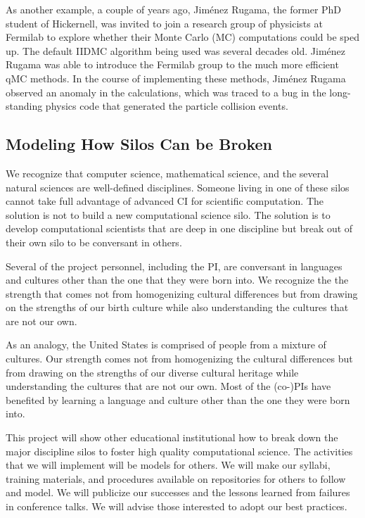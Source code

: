 \documentclass[11pt]{NSFamsart}
\begin{document}
As another example, a couple of years ago, Jim\'enez Rugama, the former PhD student of Hickernell, was invited to join a research group of physicists at Fermilab to explore whether their Monte Carlo (MC) computations could be sped up.  The default IIDMC algorithm being used was several decades old.  Jim\'enez Rugama was able to introduce the Fermilab group to the much more efficient qMC methods.  In the course of implementing these methods, Jim\'enez Rugama observed an anomaly in the calculations, which was traced to a bug in the long-standing physics code that generated the particle collision events.

\subsection{Modeling How Silos Can be Broken}
We recognize that computer science, mathematical science, and the several natural sciences are well-defined disciplines.  Someone living in one of these silos cannot take full advantage of advanced CI for scientific computation.  The solution is not to build a new computational science silo.  The solution is to develop computational scientists that are deep in one discipline but break out of their own silo to be conversant in others.

Several of the project personnel, including the PI, are conversant in languages and cultures other than the one that they were born into.  We recognize the the strength that comes not from homogenizing cultural differences but from drawing on the strengths of our birth culture while also understanding the cultures that are not our own.

As an analogy, the United States is comprised of people from a mixture of cultures.  Our strength comes not from homogenizing the cultural differences but from drawing on the strengths of our diverse cultural heritage while understanding the cultures that are not our own.  Most of the (co-)PIs have benefited by learning a language and culture other than the one they were born into.

This project will show other educational institutional how to break down the major discipline silos to foster high quality computational science.  The activities that we will implement will be models for others.  We will make our syllabi, training materials, and procedures available on repositories for others to follow and model.  We will publicize our successes and the lessons learned from failures in conference talks.  We will advise those interested to adopt our best practices.
\end{document}
